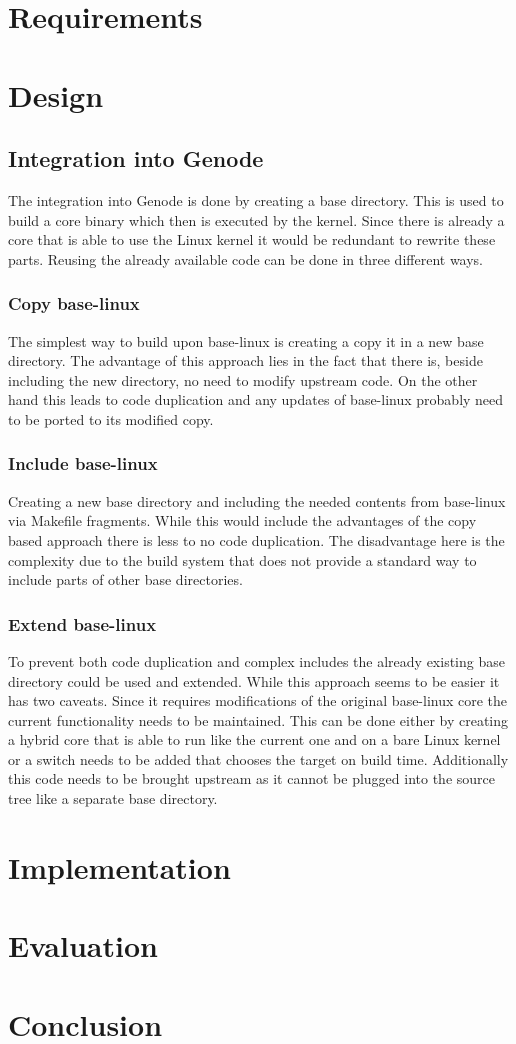 \documentclass[
a4paper,
12pt,
notitlepage,
parskip=half,
DIV=11,
]{scrbook}
\begin{document}
		
	\chapter{Requirements} %
	\chapter{Design}
		\section{Integration into Genode}
		The integration into Genode is done by creating a base directory.
		This is used to build a core binary which then is executed by the kernel.
		Since there is already a core that is able to use the Linux kernel it would be redundant to rewrite these parts.
		Reusing the already available code can be done in three different ways.
		\subsection{Copy base-linux}
		The simplest way to build upon base-linux is creating a copy it in a new base directory.
		The advantage of this approach lies in the fact that there is, beside including the new directory, no need to modify upstream code.
		On the other hand this leads to code duplication and any updates of base-linux probably need to be ported to its modified copy.
		\subsection{Include base-linux}
		Creating a new base directory and including the needed contents from base-linux via Makefile fragments.
		While this would include the advantages of the copy based approach there is less to no code duplication.
		The disadvantage here is the complexity due to the build system that does not provide a standard way to include parts of other base directories.
		\subsection{Extend base-linux}
		To prevent both code duplication and complex includes the already existing base directory could be used and extended.
		While this approach seems to be easier it has two caveats.
		Since it requires modifications of the original base-linux core the current functionality needs to be maintained.
		This can be done either by creating a hybrid core that is able to run like the current one and on a bare Linux kernel or a switch needs to be added that chooses the target on build time.
		Additionally this code needs to be brought upstream as it cannot be plugged into the source tree like a separate base directory.
	\chapter{Implementation}
	\chapter{Evaluation}
	\chapter{Conclusion}
	
	
	
	
\end{document}
